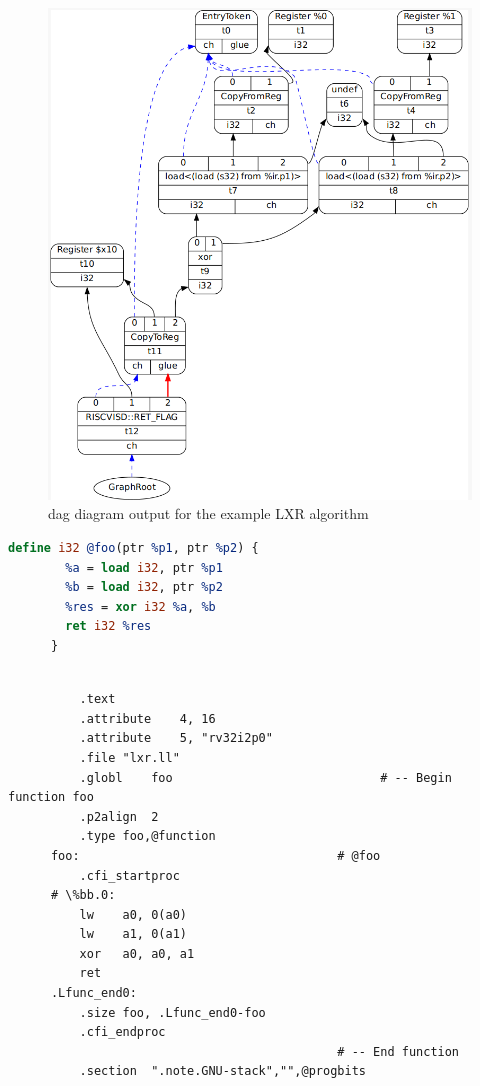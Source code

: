 \begin{figure}
    \centering
    \includegraphics[scale=0.5]{adding_new_instr/lxr_dag_diagram.png}
    \caption{dag diagram output for the example LXR algorithm}
    \label{fig:lxr_dag_diagram}
\end{figure}

\begin{lstlisting}[caption={Intermediate Representation code input for LXR algorithm}, language=llvm, style=nasm]
    define i32 @foo(ptr %p1, ptr %p2) {
        %a = load i32, ptr %p1
        %b = load i32, ptr %p2
        %res = xor i32 %a, %b
        ret i32 %res
      }
\end{lstlisting}



\begin{lstlisting}[caption= Assembly output without LXR instruction]
      
          .text
          .attribute	4, 16
          .attribute	5, "rv32i2p0"
          .file	"lxr.ll"
          .globl	foo                             # -- Begin function foo
          .p2align	2
          .type	foo,@function
      foo:                                    # @foo
          .cfi_startproc
      # \%bb.0:
          lw	a0, 0(a0)
          lw	a1, 0(a1)
          xor	a0, a0, a1
          ret
      .Lfunc_end0:
          .size	foo, .Lfunc_end0-foo
          .cfi_endproc
                                              # -- End function
          .section	".note.GNU-stack","",@progbits
      
      
\end{lstlisting}



